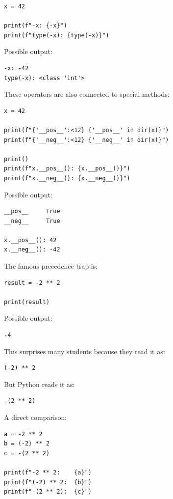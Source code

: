 \begin{verbatim}
x = 42

print(f"-x: {-x}")
print(f"type(-x): {type(-x)}")
\end{verbatim}

Possible output:

\begin{verbatim}
-x: -42
type(-x): <class 'int'>
\end{verbatim}

These operators are also connected to special methods:

\begin{verbatim}
x = 42

print(f"{'__pos__':<12} {'__pos__' in dir(x)}")
print(f"{'__neg__':<12} {'__neg__' in dir(x)}")

print()
print(f"x.__pos__(): {x.__pos__()}")
print(f"x.__neg__(): {x.__neg__()}")
\end{verbatim}

Possible output:

\begin{verbatim}
__pos__     True
__neg__     True

x.__pos__(): 42
x.__neg__(): -42
\end{verbatim}

The famous precedence trap is:

\begin{verbatim}
result = -2 ** 2

print(result)
\end{verbatim}

Possible output:

\begin{verbatim}
-4
\end{verbatim}

This surprises many students because they read it as:

\begin{verbatim}
(-2) ** 2
\end{verbatim}

But Python reads it as:

\begin{verbatim}
-(2 ** 2)
\end{verbatim}

A direct comparison:

\begin{verbatim}
a = -2 ** 2
b = (-2) ** 2
c = -(2 ** 2)

print(f"-2 ** 2:    {a}")
print(f"(-2) ** 2:  {b}")
print(f"-(2 ** 2):  {c}")
\end{verbatim}


